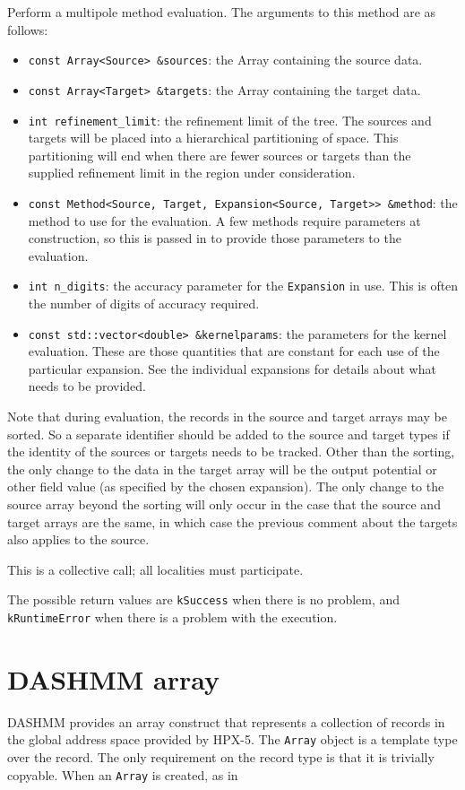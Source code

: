 \noindent Perform a multipole method evaluation. The arguments to this method
are as follows:

\begin{itemize}
\item \texttt{const Array<Source> \&sources}: the Array containing the source
  data.
\item \texttt{const Array<Target> \&targets}: the Array containing the target
  data.
\item \texttt{int refinement\_limit}: the refinement limit of the tree. The
  sources and  targets will be placed into a hierarchical partitioning of
  space. This partitioning will end when there are fewer sources or targets than
  the supplied refinement limit in the region under consideration.
\item \texttt{const Method<Source, Target, Expansion<Source, Target>> \&method}:
  the  method to use for the evaluation. A few methods require parameters at
  construction, so this is passed in to provide those parameters to the
  evaluation.
\item \texttt{int n\_digits}: the accuracy parameter for the \texttt{Expansion}
  in use. This is  often the number of digits of accuracy required.
\item \texttt{const std::vector<double> \&kernelparams}: the parameters for the
  kernel evaluation. These are those quantities that are constant for each use
  of the particular expansion. See
  the individual expansions for details about what needs to be provided.
\end{itemize}

Note that during evaluation, the records in the source and target arrays may be
sorted. So a separate identifier should be added to the source and target types
if the identity of the sources or targets needs to be tracked. Other than the
sorting, the only change to the data in the target array will be the output
potential or other field value (as specified by the chosen expansion). The
only change to the source array beyond the sorting will only occur in the case
that the source and target arrays are the same, in which case the previous
comment about the targets also applies to the source.

This is a collective call; all localities must participate.

The possible return values are \texttt{kSuccess} when there is no problem, and
\texttt{kRuntimeError} when there is a problem with the execution.


\section{DASHMM array}
DASHMM provides an array construct that represents a collection of records in
the global address space provided by HPX-5. The \texttt{Array} object is a template
type over the record. The only requirement on the record type is that it is
trivially copyable. When an \texttt{Array} is created, as in

